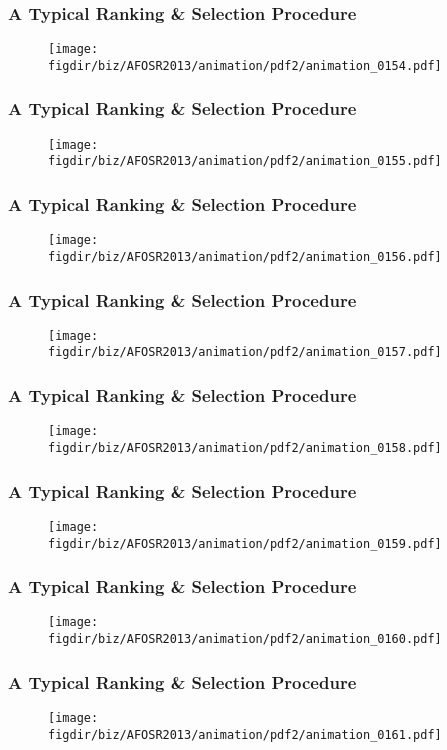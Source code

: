 \documentclass[13pt]{beamer}
\newcommand{\figdir}{../../fig}
\begin{document}
\begin{frame}\frametitle{A Typical Ranking \& Selection Procedure}\begin{figure}\texttt{[image: \\figdir/biz/AFOSR2013/animation/pdf2/animation\_0154.pdf]}\end{figure}\end{frame}
\begin{frame}\frametitle{A Typical Ranking \& Selection Procedure}\begin{figure}\texttt{[image: \\figdir/biz/AFOSR2013/animation/pdf2/animation\_0155.pdf]}\end{figure}\end{frame}
\begin{frame}\frametitle{A Typical Ranking \& Selection Procedure}\begin{figure}\texttt{[image: \\figdir/biz/AFOSR2013/animation/pdf2/animation\_0156.pdf]}\end{figure}\end{frame}
\begin{frame}\frametitle{A Typical Ranking \& Selection Procedure}\begin{figure}\texttt{[image: \\figdir/biz/AFOSR2013/animation/pdf2/animation\_0157.pdf]}\end{figure}\end{frame}
\begin{frame}\frametitle{A Typical Ranking \& Selection Procedure}\begin{figure}\texttt{[image: \\figdir/biz/AFOSR2013/animation/pdf2/animation\_0158.pdf]}\end{figure}\end{frame}
\begin{frame}\frametitle{A Typical Ranking \& Selection Procedure}\begin{figure}\texttt{[image: \\figdir/biz/AFOSR2013/animation/pdf2/animation\_0159.pdf]}\end{figure}\end{frame}
\begin{frame}\frametitle{A Typical Ranking \& Selection Procedure}\begin{figure}\texttt{[image: \\figdir/biz/AFOSR2013/animation/pdf2/animation\_0160.pdf]}\end{figure}\end{frame}
\begin{frame}\frametitle{A Typical Ranking \& Selection Procedure}\begin{figure}\texttt{[image: \\figdir/biz/AFOSR2013/animation/pdf2/animation\_0161.pdf]}\end{figure}\end{frame}
\end{document}
